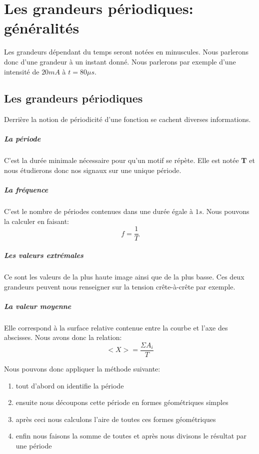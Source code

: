 \documentclass[11pt,a4paper,openany]{book}
\begin{document}
\chapter{Les grandeurs périodiques: généralités}

Les grandeurs dépendant du temps seront notées en minuscules. Nous parlerons donc d'une grandeur à un instant donné. Nous parlerons par exemple d'une intensité de $ 20 mA $ à $ t = 80 \mu s $.

\section{Les grandeurs périodiques}

Derrière la notion de périodicité d'une fonction se cachent diverses informations.

\paragraph{La période} C'est la durée minimale nécessaire pour qu'un motif se répète. Elle est notée \textbf{T} et nous étudierons donc nos signaux sur une unique période.

\paragraph{La fréquence} C'est le nombre de périodes contenues dans une durée égale à $ 1s $. Nous pouvons la calculer en faisant:
\begin{equation}
f = \frac{1}{T}
\end{equation}

\paragraph{Les valeurs extrémales} Ce sont les valeurs de la plus haute image ainsi que de la plus basse. Ces deux grandeurs peuvent nous renseigner sur la tension crête-à-crête par exemple.

\paragraph{La valeur moyenne} Elle correspond à la surface relative contenue entre la courbe et l'axe des abscisses. Nous avons donc la relation:
\begin{equation}
<X> = \frac{\Sigma A_{i}}{T}
\end{equation}

Nous pouvons donc appliquer la méthode suivante:
\begin{enumerate}
\item tout d'abord on identifie la période
\item ensuite nous découpons cette période en formes géométriques simples
\item après ceci nous calculons l'aire de toutes ces formes géométriques
\item enfin nous faisons la somme de toutes et après nous divisons le résultat par une période
\end{enumerate}
\end{document}
